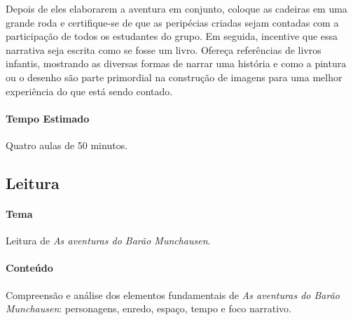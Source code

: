 \documentclass[11pt]{extarticle}
\begin{document}
Depois de eles elaborarem a aventura em conjunto, coloque as cadeiras em uma grande roda e certifique-se de que as peripécias criadas sejam contadas com a participação de todos os estudantes do grupo. Em seguida, incentive que essa narrativa seja escrita como se fosse um livro. Ofereça referências de livros infantis, mostrando as diversas formas de narrar uma história e como a pintura ou o desenho são parte primordial na construção de imagens para uma melhor experiência do que está sendo contado. 


\paragraph{Tempo Estimado} Quatro aulas de 50 minutos. 

\subsection{Leitura}


\paragraph{Tema} Leitura de \textit{As aventuras do Barão Munchausen}.  

\paragraph{Conteúdo} Compreensão e análise dos elementos fundamentais de \textit{As aventuras do Barão Munchausen}: personagens, enredo, espaço, tempo e foco narrativo.  
\end{document}
